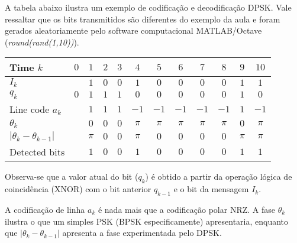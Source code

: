 A tabela abaixo ilustra um exemplo de codificação e decodificação DPSK. Vale ressaltar que os bits transmitidos são diferentes do exemplo da aula e foram gerados aleatoriamente pelo software computacional MATLAB/Octave (\textit{round(rand(1,10))}).

\begin{table}[H]
\centering
\begin{tabular}{lccccccccccc}
 Time $k$ & $0$ & $1$ & $2$ & $3$ & $4$ & $5$ & $6$ & $7$ & $8$ & $9$ & $10$ \vspace{2pt} \\   \hline

$I_k$ &  & $1$ & $0$ & $0$ & $1$ & $0$ & $0$ & $0$ & $0$ & $1$ & $1$ \\ 

$q_k$ & $0$ & $1$ & $1$ & $1$ & $0$ & $0$ & $0$ & $0$ & $0$ & $1$ & $0$ \\ 

Line code $a_k$ &  & $1$ & $1$ & $1$ & $-1$ & $-1$ & $-1$ & $-1$ & $-1$ & $1$ & $-1$ \\ 

$\theta_k$ &  & $0$ & $0$ & $0$ & $\pi$ & $\pi$ & $\pi$ & $\pi$ & $\pi$ & $0$ & $\pi$ \\

$|\theta_k-\theta_{k-1}|$ &  & $\pi$ & $0$ & $0$ & $\pi$ & $0$ & $0$ & $0$ & $0$ & $\pi$ & $\pi$  \\

Detected bits &  & $1$ & $0$ & $0$ & $1$ & $0$ & $0$ & $0$ & $0$ & $1$ & $1$  \\ 
\end{tabular}
\end{table}

Observa-se que a valor atual do bit ($q_k$) é obtido a partir da operação lógica de coincidência (XNOR) com o bit anterior $q_{k-1}$ e o bit da mensagem $I_k$.

A codificação de linha $a_k$ é nada mais que a codificação polar NRZ. A fase $\theta_k$ ilustra o que um simples PSK (BPSK especificamente) apresentaria, enquanto que $|\theta_k-\theta_{k-1}|$ apresenta a fase experimentada pelo DPSK.